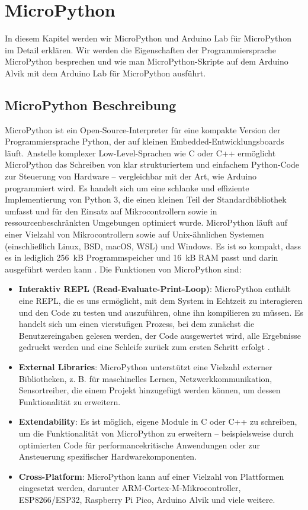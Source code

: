 %
%



\chapter{MicroPython}


In diesem Kapitel werden wir MicroPython und Arduino Lab für MicroPython im Detail erklären. Wir werden die Eigenschaften der Programmiersprache MicroPython besprechen und wie man MicroPython-Skripte auf dem Arduino Alvik mit dem Arduino Lab für MicroPython ausführt. 
\section{MicroPython Beschreibung}
MicroPython ist ein Open-Source-Interpreter für eine kompakte Version der Programmiersprache Python, der auf kleinen Embedded-Entwicklungsboards läuft. Anstelle komplexer Low-Level-Sprachen wie C oder C++ ermöglicht MicroPython das Schreiben von klar strukturiertem und einfachem Python-Code zur Steuerung von Hardware – vergleichbar mit der Art, wie Arduino programmiert wird. Es handelt sich um eine schlanke und effiziente Implementierung von Python 3, die einen kleinen Teil der Standardbibliothek umfasst und für den Einsatz auf Mikrocontrollern sowie in ressourcenbeschränkten Umgebungen optimiert wurde.
MicroPython läuft auf einer Vielzahl von Mikrocontrollern sowie auf Unix-ähnlichen Systemen (einschließlich Linux, BSD, macOS, WSL) und Windows. Es ist so kompakt, dass es in lediglich 256~kB Programmspeicher und 16~kB RAM passt und darin ausgeführt werden kann \cite{MicroPythonGitHub:2025,MicroPython:2025}. 
Die Funktionen von MicroPython sind:

\begin{itemize}
	\item \textbf{Interaktiv REPL (Read-Evaluate-Print-Loop)}: MicroPython enthält eine REPL, die es uns ermöglicht, mit dem System in Echtzeit zu interagieren und den Code zu testen und auszuführen, ohne ihn kompilieren zu müssen. Es handelt sich um einen vierstufigen Prozess, bei dem zunächst die Benutzereingaben gelesen werden, der Code ausgewertet wird, alle Ergebnisse gedruckt werden und eine Schleife zurück zum ersten Schritt erfolgt \cite{ellis:2019}. 
	\item \textbf{External Libraries}: MicroPython unterstützt eine Vielzahl externer Bibliotheken, z. B. für maschinelles Lernen, Netzwerkkommunikation, Sensortreiber, die einem Projekt hinzugefügt werden können, um dessen Funktionalität zu erweitern.
	\item \textbf{Extendability}: Es ist möglich, eigene Module in C oder C++ zu schreiben, um die Funktionalität von MicroPython zu erweitern – beispielsweise durch optimierten Code für performancekritische Anwendungen oder zur Ansteuerung spezifischer Hardwarekomponenten.
	\item \textbf{Cross-Platform}: MicroPython kann auf einer Vielzahl von Plattformen eingesetzt werden, darunter ARM-Cortex-M-Mikrocontroller, ESP8266/ESP32, Raspberry Pi Pico, Arduino Alvik und viele weitere.
\end{itemize}

